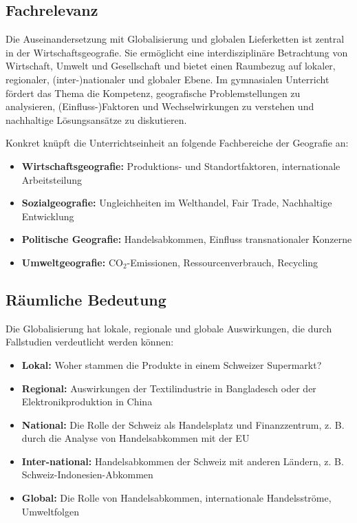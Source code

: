 \subsection{Fachrelevanz}
Die Auseinandersetzung mit Globalisierung und globalen Lieferketten ist zentral in der Wirtschaftsgeografie. Sie ermöglicht eine interdisziplinäre Betrachtung von Wirtschaft, Umwelt und Gesellschaft und bietet einen Raumbezug auf lokaler, regionaler, (inter-)nationaler und globaler Ebene. Im gymnasialen Unterricht fördert das Thema die Kompetenz, geografische Problemstellungen zu analysieren, (Einfluss-)Faktoren und Wechselwirkungen zu verstehen und nachhaltige Lösungsansätze zu diskutieren.

Konkret knüpft die Unterrichtseinheit an folgende Fachbereiche der Geografie an:
\begin{itemize}
    \item \textbf{Wirtschaftsgeografie:} Produktions- und Standortfaktoren, internationale Arbeitsteilung
    \item \textbf{Sozialgeografie:} Ungleichheiten im Welthandel, Fair Trade, Nachhaltige Entwicklung
    \item \textbf{Politische Geografie:} Handelsabkommen, Einfluss transnationaler Konzerne
    \item \textbf{Umweltgeografie:} CO$_2$-Emissionen, Ressourcenverbrauch, Recycling
\end{itemize}

\subsection{Räumliche Bedeutung}
Die Globalisierung hat lokale, regionale und globale Auswirkungen, die durch Fallstudien verdeutlicht werden können:
\begin{itemize}
    \item \textbf{Lokal:} Woher stammen die Produkte in einem Schweizer Supermarkt?
    \item \textbf{Regional:} Auswirkungen der Textilindustrie in Bangladesch oder der Elektronikproduktion in China
    \item \textbf{National:}  Die Rolle der Schweiz als Handelsplatz und Finanzzentrum, z. B. durch die Analyse von Handelsabkommen mit der EU
    \item \textbf{Inter-national:}  Handelsabkommen der Schweiz mit anderen Ländern, z. B. Schweiz-Indonesien-Abkommen
    \item \textbf{Global:} Die Rolle von Handelsabkommen, internationale Handelsströme, Umweltfolgen
\end{itemize}

